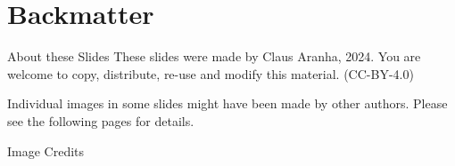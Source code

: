 \section{Backmatter}
\begin{frame}{About these Slides}
  These slides were made by Claus Aranha, 2024. You are welcome to copy, distribute, re-use and modify this material.
  (CC-BY-4.0)
  \bigskip

  Individual images in some slides might have been made by other
  authors. Please see the following pages for details.
\end{frame}

\begin{frame}[allowframebreaks]{Image Credits}
  \printnotes
\end{frame}
